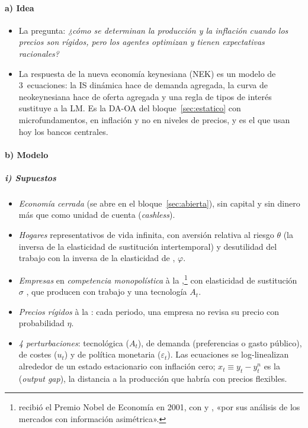 \documentclass[11pt]{article}
\begin{document}
\paragraph{a) Idea}

\begin{itemize}
\item La pregunta: \emph{¿cómo se determinan la producción y la inflación cuando los precios son rígidos, pero los agentes optimizan y tienen expectativas racionales?}
\item La respuesta de la nueva economía keynesiana (NEK)\nocite{ClaridaGaliGertler1999Science,Woodford2003Interest,Gali2015Monetary}  es un modelo de 3~ecuaciones: la IS dinámica hace de demanda agregada, la curva de  neokeynesiana hace de oferta agregada y una regla de tipos de interés sustituye a la LM. Es la DA-OA del bloque~\ref{sec:estatico} con microfundamentos, en inflación y no en niveles de precios, y es el que usan hoy los bancos centrales.
\end{itemize}

\paragraph{b) Modelo}

\subparagraph{i) Supuestos}

\begin{itemize}
\item \emph{Economía cerrada} (se abre en el bloque~\ref{sec:abierta}), sin capital y sin dinero más que como unidad de cuenta (\emph{cashless}).
\item \emph{Hogares} representativos de vida infinita, con aversión relativa al riesgo $\theta$ (la inversa de la elasticidad de sustitución intertemporal) y desutilidad del trabajo con la inversa de la elasticidad de , $\varphi$.
\item \emph{Empresas} en \emph{competencia monopolística} à la \textcite{DixitStiglitz1977Monopolistic},\footnote{ recibió el Premio Nobel de Economía en 2001, con  y , «por sus análisis de los mercados con información asimétrica»\nocite{Nobel2001AkerlofSpenceStiglitz}.} con elasticidad de sustitución $\sigma$ , que producen con trabajo y una tecnología $A_t$.
\item \emph{Precios rígidos} à la \textcite{Calvo1983Staggered}: cada periodo, una empresa no revisa su precio con probabilidad $\eta$.
\item \emph{4 perturbaciones}: tecnológica ($A_t$), de demanda (preferencias o gasto público), de costes ($u_t$) y de política monetaria ($\varepsilon_t$). Las ecuaciones se log-linealizan alrededor de un estado estacionario con inflación cero; $x_t\equiv y_t-y^n_t$ es la  (\emph{output gap}), la distancia a la producción que habría con precios flexibles.
\end{itemize}
\end{document}
